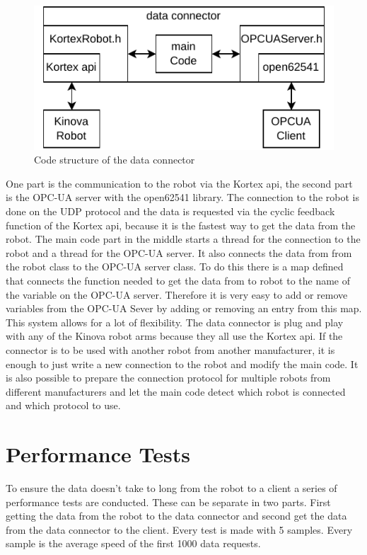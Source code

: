\documentclass[conference]{IEEEtran}
\begin{document}
\begin{figure}[htbp]
    \centerline{\includegraphics{Pictures/dataConectorStructure.pdf}}
    \caption{Code structure of the data connector}
    \label{fig:dataConectorStructure}
\end{figure}
One part is the communication to the robot via the Kortex api, the second part is the OPC-UA server with the open62541 library.
The connection to the robot is done on the UDP protocol and the data is requested via the cyclic feedback function of the Kortex api, because it is the fastest way to get the data from the robot.
The main code part in the middle  starts a thread for the connection to the robot and a thread for the OPC-UA server.
It also connects the data from from the robot class to the OPC-UA server class.
To do this there is a map defined that connects the function needed to get the data from to robot to the name of the variable on the OPC-UA server.
Therefore it is very easy to add or remove variables from the OPC-UA Sever by adding or removing an entry from this map.\\
This system allows for a lot of flexibility. The data connector is plug and play with any of the Kinova robot arms because they all use the Kortex api.
If the connector is to be used with another robot from another manufacturer, it is enough to just write a new connection to the robot and modify the main code.
It is also possible to prepare the connection protocol for multiple robots from different manufacturers and let the main code detect which robot is connected and which protocol to use.

\section{Performance Tests}
To ensure the data doesn't take to long from the robot to a client a series of performance tests are conducted.
These can be separate in two parts. 
First getting the data from the robot to the data connector and second get the data from the data connector to the client.
Every test is made with 5 samples. Every sample is the average speed of the first 1000 data requests.
\end{document}

